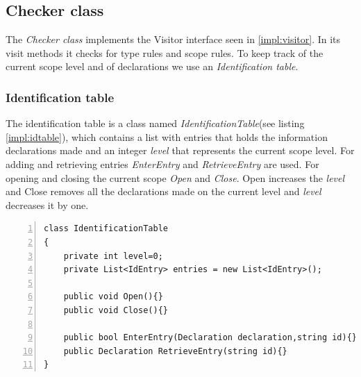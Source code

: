 	\subsection{Checker class}
		The {\it Checker class} implements the Visitor interface seen in \ref{impl:visitor}. 
		In its visit methods it checks for type rules and scope rules. 
		To keep track of the current scope level and of declarations we use an {\it Identification table}.
		
		\subsubsection{Identification table}
			The identification table is a class named {\it IdentificationTable}(see listing \ref{impl:idtable}), which contains a list with entries 
			that holds the information declarations made and an integer {\it level} that represents the current scope level. 
			For adding and retrieving entries {\it EnterEntry} and {\it RetrieveEntry} are used.
			For opening and closing the current scope {\it Open} and {\it Close}. Open increases the {\it level} and Close removes 
			all the declarations made on the current level and {\it level} decreases it by one.
			\begin{lstlisting}[basicstyle=\small\sffamily,
					keywords={break,case,const,continue,default,else,enum,
					for,if,return,switch,while,do,long,void,int,float,double,
					char,struct,typedef,include,size\_t},
					keywordstyle={\color{blue}},
					comment={[l]{//}}, morecomment={[s]{/*}{*/}}, commentstyle=\itshape,
					columns={[l]flexible}, numbers=left, numberstyle=\tiny,
					frameround=fftt, frame=shadowbox, captionpos=b,
					caption={The IdentificationTable class},
					label=impl:idtable]
class IdentificationTable
{
	private int level=0;
	private List<IdEntry> entries = new List<IdEntry>();
	
	public void Open(){}
	public void Close(){}
	
	public bool EnterEntry(Declaration declaration,string id){}
	public Declaration RetrieveEntry(string id){}
}
			\end{lstlisting}	
		
